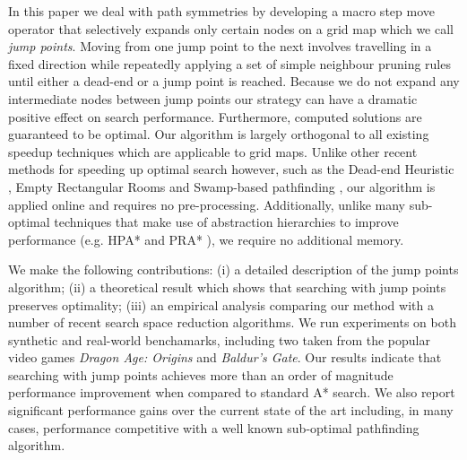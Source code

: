In this paper we deal with path symmetries by developing a macro step move
operator that selectively expands only certain nodes on a grid map which we call
\emph{jump points}. Moving from one jump point to the next involves travelling
in a fixed direction while repeatedly applying a set of simple neighbour pruning
rules until either a dead-end or a jump point is reached.  Because we do not
expand any intermediate nodes between jump points our strategy can have a
dramatic positive effect on search performance.  Furthermore, computed solutions
are guaranteed to be optimal.  Our algorithm is largely orthogonal to all
existing speedup techniques which are applicable to grid maps.  Unlike other
recent methods for speeding up optimal search however, such as the Dead-end
Heuristic \cite{bjornsson06}, Empty Rectangular Rooms \cite{harabor10} and
Swamp-based pathfinding \cite{pochter10}, our algorithm is applied online and
requires no pre-processing.  Additionally, unlike many sub-optimal techniques
that make use of abstraction hierarchies to improve performance (e.g. HPA* \cite{botea04}
and PRA* \cite{sturtevant05}), we require no additional memory.

We make the following contributions: (i) a detailed description of the jump
points algorithm; (ii) a theoretical result which shows that searching with jump
points preserves optimality;  (iii) an empirical analysis comparing our method
with a number of recent search space reduction algorithms.  We run experiments
on both synthetic and real-world benchamarks, including two taken from the
popular video games \emph{Dragon Age: Origins} and \emph{Baldur's Gate}.  Our
results indicate that searching with jump points achieves more than an order of
magnitude performance improvement when compared to standard A* search.  We also
report significant performance gains over the current state of the art
including, in many cases, performance competitive with a well known sub-optimal
pathfinding algorithm.
% 
